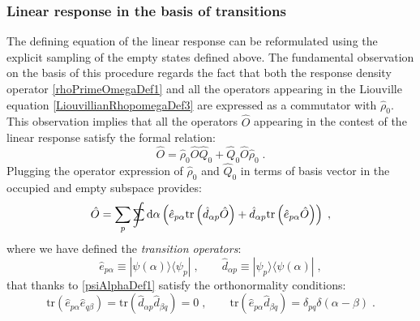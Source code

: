 \documentclass[a4paper]{article}
\newcommand{\dd}{{\rm d}}
\newcommand{\sint}{\mathrlap{\displaystyle\int}
\mathrlap{\textstyle\sum}
\phantom{\mathrlap{\displaystyle
\int}\textstyle\sum}}
\newcommand{\be}{\begin{equation}}
\newcommand{\ee}{\end{equation}}
\newcommand{\qq}{\qquad}
\newcommand{\lb}{\label}
\newcommand{\op}[1]{\hat {#1}}
\newcommand{\trace}[1]{\mathrm{tr}\left(#1\right)}
\newcommand{\ketbra}[2]{| #1 \rangle \langle #2 |}
\newcommand{\dmnot}{\op{\rho}_0}
\newcommand{\excite}[2]{\op e_{{#1}{#2}}}
\newcommand{\decay}[2]{\op d_{{#1}{#2}}}
\begin{document}
\subsubsection{Linear response in the basis of transitions}

The defining equation of the linear response can be reformulated using the explicit sampling of the empty states defined above. The fundamental observation on the basis
of this procedure regards the fact that both the response density operator \eqref{rhoPrimeOmegaDef1} and all the operators appearing in the Liouville equation 
\eqref{LiouvillianRhopomegaDef3} are expressed as a commutator with $\dmnot$. This observation implies that all the operators $\op O$ appearing in the contest of the linear 
response satisfy the formal relation:
\be
\op O = \dmnot\op O\op Q_0 + \op Q_0\op O\dmnot \;.
\ee
Plugging the operator expression of $\dmnot$ and $\op Q_0$ in terms of basis vector in the occupied and empty subspace provides:
\be\lb{OperatorTransBasisExpDef1}
\op O = \sum_p\sint \dd \alpha\left(
\excite{p}{\alpha}\trace{\decay{\alpha}{p}\op O} + \decay{\alpha}{p}\trace{\excite{p}{\alpha}\op O}
\right) \;,
\ee
where we have defined the \emph{transition operators}:
\be
\excite{p}{\alpha} \equiv \ketbra{\psi(\alpha)}{\psi_p}\;, \qq
\decay{\alpha}{p} \equiv \ketbra{\psi_p}{\psi(\alpha)} \;,
\ee
that thanks to \eqref{psiAlphaDef1} satisfy the orthonormality conditions:
\be\lb{transitionOpOrthonormalityDef1}
\trace{\excite{p}{\alpha}\excite{q}{\beta}} = \trace{\decay{\alpha}{p}\decay{\beta}{q}} = 0 \;, \qq
\trace{\excite{p}{\alpha}\decay{\beta}{q}} = \delta_{pq}\delta(\alpha-\beta) \;.
\ee
\end{document}
